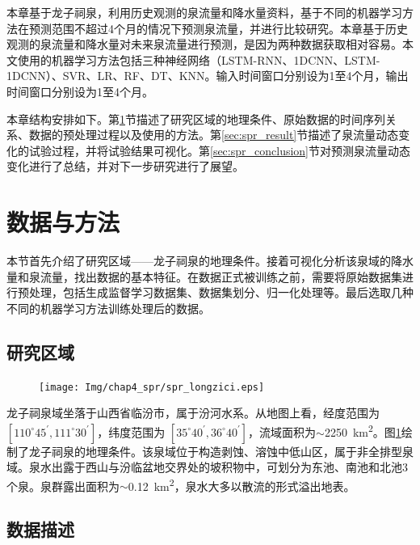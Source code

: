 本章基于龙子祠泉，利用历史观测的泉流量和降水量资料，基于不同的机器学习方法在预测范围不超过4个月的情况下预测泉流量，并进行比较研究。本章基于历史观测的泉流量和降水量对未来泉流量进行预测，是因为两种数据获取相对容易。本文使用的机器学习方法包括三种神经网络（LSTM-RNN、1DCNN、LSTM-1DCNN）、SVR、LR、RF、DT、KNN。输入时间窗口分别设为1至4个月，输出时间窗口分别设为1至4个月。

本章结构安排如下。第\ref{sec:spr_data_method}节描述了研究区域的地理条件、原始数据的时间序列关系、数据的预处理过程以及使用的方法。第\ref{sec:spr_result}节描述了泉流量动态变化的试验过程，并将试验结果可视化。第\ref{sec:spr_conclusion}节对预测泉流量动态变化进行了总结，并对下一步研究进行了展望。

\section{数据与方法}\label{sec:spr_data_method}

本节首先介绍了研究区域——龙子祠泉的地理条件。接着可视化分析该泉域的降水量和泉流量，找出数据的基本特征。在数据正式被训练之前，需要将原始数据集进行预处理，包括生成监督学习数据集、数据集划分、归一化处理等。最后选取几种不同的机器学习方法训练处理后的数据。

\subsection{研究区域}\label{sec:spr_area}

\begin{figure}[!htbp]
  \centering
  \texttt{[image: Img/chap4\_spr/spr\_longzici.eps]}
  \label{fig:spri_longzici}
\end{figure}

龙子祠泉域坐落于山西省临汾市，属于汾河水系。从地图上看，经度范围为
$[110^\circ 45^\prime,111^\circ 30^\prime]$，纬度范围为
$[35^\circ 40^\prime,36^\circ 40^\prime]$，流域面积为$\sim$\SI{2250}{km^{2}}。图\ref{fig:spri_longzici}绘制了龙子祠泉的地理条件。该泉域位于构造剥蚀、溶蚀中低山区，属于非全排型泉域。泉水出露于西山与汾临盆地交界处的坡积物中，可划分为东池、南池和北池3个泉。泉群露出面积为$\sim$\SI{0.12}{km^{2}}，泉水大多以散流的形式溢出地表。

\subsection{数据描述}\label{sec:spr_deal_data}

